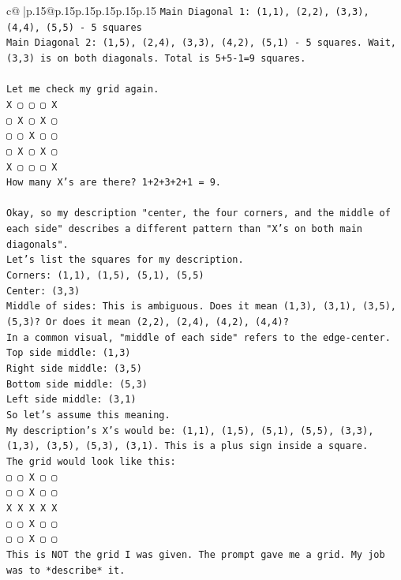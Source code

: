 \documentclass{article}
\begin{document}
{\begin{supertabular}{c@{$\;$}|p{.15\linewidth}@{}p{.15\linewidth}p{.15\linewidth}p{.15\linewidth}p{.15\linewidth}p{.15\linewidth}}
{{{\texttt{Main Diagonal 1: (1,1), (2,2), (3,3), (4,4), (5,5) {-} 5 squares} \\
\texttt{Main Diagonal 2: (1,5), (2,4), (3,3), (4,2), (5,1) {-} 5 squares. Wait, (3,3) is on both diagonals. Total is 5+5{-}1=9 squares.} \\
\\ 
\texttt{Let me check my grid again.} \\
\texttt{X ▢ ▢ ▢ X} \\
\texttt{▢ X ▢ X ▢} \\
\texttt{▢ ▢ X ▢ ▢} \\
\texttt{▢ X ▢ X ▢} \\
\texttt{X ▢ ▢ ▢ X} \\
\texttt{How many X's are there? 1+2+3+2+1 = 9.} \\
\\ 
\texttt{Okay, so my description "center, the four corners, and the middle of each side" describes a different pattern than "X's on both main diagonals".} \\
\texttt{Let's list the squares for my description.} \\
\texttt{Corners: (1,1), (1,5), (5,1), (5,5)} \\
\texttt{Center: (3,3)} \\
\texttt{Middle of sides: This is ambiguous. Does it mean (1,3), (3,1), (3,5), (5,3)? Or does it mean (2,2), (2,4), (4,2), (4,4)?} \\
\texttt{In a common visual, "middle of each side" refers to the edge{-}center.} \\
\texttt{Top side middle: (1,3)} \\
\texttt{Right side middle: (3,5)} \\
\texttt{Bottom side middle: (5,3)} \\
\texttt{Left side middle: (3,1)} \\
\texttt{So let's assume this meaning.} \\
\texttt{My description's X's would be: (1,1), (1,5), (5,1), (5,5), (3,3), (1,3), (3,5), (5,3), (3,1). This is a plus sign inside a square.} \\
\texttt{The grid would look like this:} \\
\texttt{▢ ▢ X ▢ ▢} \\
\texttt{▢ ▢ X ▢ ▢} \\
\texttt{X X X X X} \\
\texttt{▢ ▢ X ▢ ▢} \\
\texttt{▢ ▢ X ▢ ▢} \\
\texttt{This is NOT the grid I was given. The prompt gave me a grid. My job was to *describe* it.} \\
}}}
\end{supertabular}}
\end{document}
